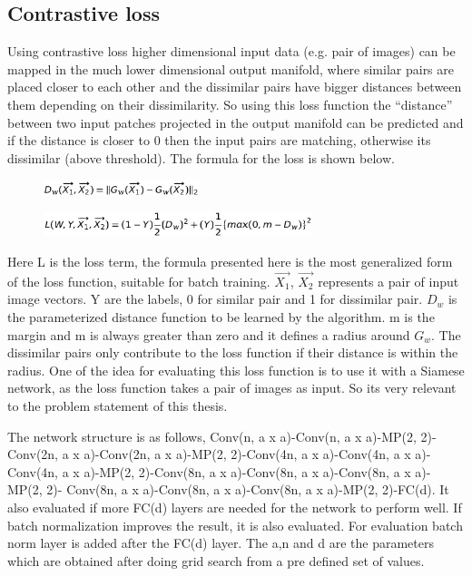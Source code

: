 \subsection{Contrastive loss}
Using contrastive loss higher dimensional input data (e.g. pair of images) can be mapped in the much lower dimensional output manifold, where similar pairs are placed closer to each other and 
the dissimilar pairs have bigger distances between them depending on their dissimilarity.  So using this loss function the “distance” between two input patches projected in the output manifold can be 
predicted and if the distance is closer to 0 then the input pairs are matching, otherwise its dissimilar (above threshold). The formula for the loss is shown below. 
\begin{figure}[ht]
\centering
\includegraphics[height= 0.45cm]{images/contrastive/contrastive_loss_formula1.jpg}%
\label{fig:contrastive_loss_formula1}
\end{figure}

\begin{figure}[ht]
\centering
\includegraphics[height= 0.7cm]{images/contrastive/contrastive_loss_formula2.jpg}
\label{fig:contrastive_loss_formula2}
\end{figure}

Here L is the loss term, the formula presented here is the most generalized form of the loss function, suitable for batch training. 
$ \vec{X_1}$, $ \vec{X_2}$ represents a pair of input image vectors. Y are the labels, 0 for similar pair and 1 for dissimilar pair. $D_w$ is the parameterized distance function to be learned by the algorithm. 
m is the margin and m is always greater than zero and it defines a radius around $G_w$. The dissimilar pairs only contribute to the loss function if their distance is within the radius.
One of the idea for evaluating this loss function is to use it with a Siamese network, as the loss function takes a pair of images as input. So its very relevant to the problem statement of this thesis. 

The network structure is as follows, Conv(n, a x a)-Conv(n, a x a)-MP(2, 2)-Conv(2n, a x a)-Conv(2n, a x a)-MP(2, 2)-Conv(4n, a x a)-Conv(4n, a x a)-Conv(4n, a x a)-MP(2, 2)-Conv(8n, a x a)-Conv(8n, a x a)-Conv(8n, a x a)-MP(2, 2)-
Conv(8n, a x a)-Conv(8n, a x a)-Conv(8n, a x a)-MP(2, 2)-FC(d). It also evaluated if more FC(d) layers are needed for the network to perform well. If batch normalization improves the result, it is also evaluated. For evaluation batch norm
layer is added after the FC(d) layer. The a,n and d are the parameters which are obtained after doing grid search from a pre defined set of values. %

